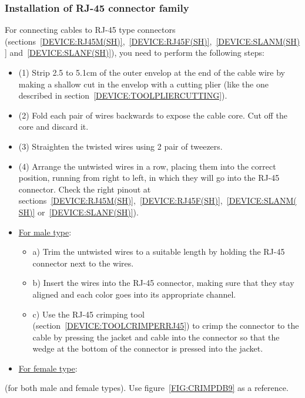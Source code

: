 \subsubsection{Installation of RJ-45 connector family} \label{CRIMPINGRJ45}
For connecting cables to RJ-45 type connectors (sections~\ref{DEVICE:RJ45M(SH)},~\ref{DEVICE:RJ45F(SH)},~\ref{DEVICE:SLANM(SH)} and~\ref{DEVICE:SLANF(SH)}), you need to perform the following steps:
  \begin{itemize}
    \item (1) Strip 2.5 to 5.1cm of the outer envelop at the end of the cable wire by making a shallow cut in the envelop with a cutting plier (like the one described in section~\ref{DEVICE:TOOLPLIERCUTTING}).
    \item (2) Fold each pair of wires backwards to expose the cable core. Cut off the core and discard it.
    \item (3) Straighten the twisted wires using 2 pair of tweezers.
    \item (4) Arrange the untwisted wires in a row, placing them into the correct position, running from right to left, in which they will go into the RJ-45 connector. Check the right pinout at sections~\ref{DEVICE:RJ45M(SH)},~\ref{DEVICE:RJ45F(SH)},~\ref{DEVICE:SLANM(SH)} or~\ref{DEVICE:SLANF(SH)}).
    \item \underline{For male type}:
    \begin{itemize}
      \item a) Trim the untwisted wires to a suitable length by holding the RJ-45 connector next to the wires.
      \item b) Insert the wires into the RJ-45 connector, making sure that they stay aligned and each color goes into its appropriate channel.
      \item c) Use the RJ-45 crimping tool (section~\ref{DEVICE:TOOLCRIMPERRJ45}) to crimp the connector to the cable by pressing the jacket and cable into the connector so that the wedge at the bottom of the connector is pressed into the jacket.
    \end{itemize}
    \item \underline{For female type}:
  \end{itemize}
 (for both male and female types). Use figure~\ref{FIG:CRIMPDB9} as a reference.
